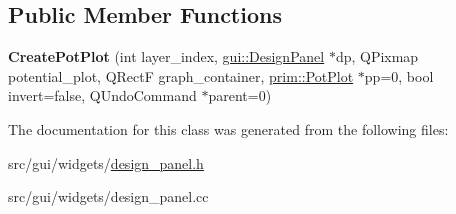 \subsection*{Public Member Functions}
\begin{DoxyCompactItemize}
\item 
{\bfseries Create\+Pot\+Plot} (int layer\+\_\+index, \hyperlink{classgui_1_1DesignPanel}{gui\+::\+Design\+Panel} $\ast$dp, Q\+Pixmap potential\+\_\+plot, Q\+RectF graph\+\_\+container, \hyperlink{classprim_1_1PotPlot}{prim\+::\+Pot\+Plot} $\ast$pp=0, bool invert=false, Q\+Undo\+Command $\ast$parent=0)\hypertarget{classgui_1_1DesignPanel_1_1CreatePotPlot_a9d19b552a75aa8c4a538ccb1b6647f2e}{}\label{classgui_1_1DesignPanel_1_1CreatePotPlot_a9d19b552a75aa8c4a538ccb1b6647f2e}

\end{DoxyCompactItemize}


The documentation for this class was generated from the following files\+:\begin{DoxyCompactItemize}
\item 
src/gui/widgets/\hyperlink{design__panel_8h}{design\+\_\+panel.\+h}\item 
src/gui/widgets/design\+\_\+panel.\+cc\end{DoxyCompactItemize}
